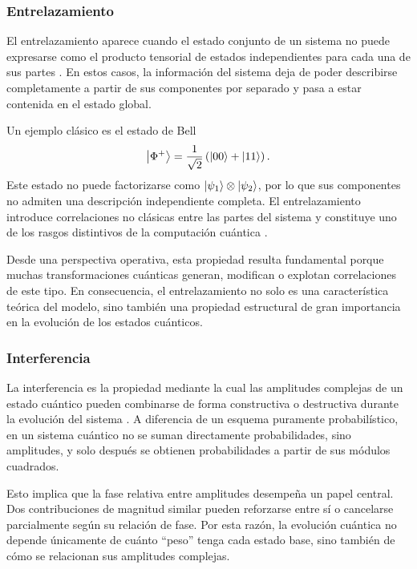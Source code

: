 \subsubsection{Entrelazamiento}

El entrelazamiento aparece cuando el estado conjunto de un sistema no puede expresarse como el producto tensorial de estados independientes para cada una de sus partes \parencite{Nielsen2010}. En estos casos, la información del sistema deja de poder describirse completamente a partir de sus componentes por separado y pasa a estar contenida en el estado global.

Un ejemplo clásico es el estado de Bell
\[
    \ket{\Phi^+} = \frac{1}{\sqrt{2}}\left(\ket{00} + \ket{11}\right).
\]
Este estado no puede factorizarse como $\ket{\psi_1} \otimes \ket{\psi_2}$, por lo que sus componentes no admiten una descripción independiente completa. El entrelazamiento introduce correlaciones no clásicas entre las partes del sistema y constituye uno de los rasgos distintivos de la computación cuántica \parencite{Nielsen2010}.

Desde una perspectiva operativa, esta propiedad resulta fundamental porque muchas transformaciones cuánticas generan, modifican o explotan correlaciones de este tipo. En consecuencia, el entrelazamiento no solo es una característica teórica del modelo, sino también una propiedad estructural de gran importancia en la evolución de los estados cuánticos.

\subsubsection{Interferencia}

La interferencia es la propiedad mediante la cual las amplitudes complejas de un estado cuántico pueden combinarse de forma constructiva o destructiva durante la evolución del sistema \parencite{Nielsen2010}. A diferencia de un esquema puramente probabilístico, en un sistema cuántico no se suman directamente probabilidades, sino amplitudes, y solo después se obtienen probabilidades a partir de sus módulos cuadrados.

Esto implica que la fase relativa entre amplitudes desempeña un papel central. Dos contribuciones de magnitud similar pueden reforzarse entre sí o cancelarse parcialmente según su relación de fase. Por esta razón, la evolución cuántica no depende únicamente de cuánto ``peso'' tenga cada estado base, sino también de cómo se relacionan sus amplitudes complejas.

